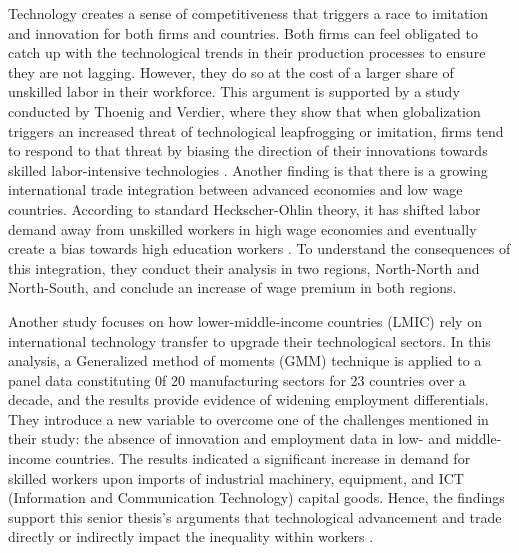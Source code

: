 \documentclass[12pt,oneside]{book} %
\begin{document}
Technology creates a sense of competitiveness that triggers a race to imitation and innovation for both firms and countries. Both firms can feel obligated to catch up with the technological trends in their production processes to ensure they are not lagging. However, they do so at the cost of a larger share of unskilled labor in their workforce. This argument is supported by a study conducted by Thoenig and Verdier, where they show that when globalization triggers an increased threat of technological leapfrogging or imitation, firms tend to respond to that threat by biasing the direction of their innovations towards skilled labor-intensive technologies \cite{thoenig2003theory}. Another finding is that there is a  growing international trade integration between advanced economies and low wage countries. According to standard Heckscher-Ohlin theory, it has shifted labor demand away from unskilled workers in high wage economies and eventually create a bias towards high education workers \cite{leamerheckscher}. To understand the consequences of this integration, they conduct their analysis in two regions, North-North and North-South, and conclude an increase of wage premium in both regions.

Another study focuses on how lower-middle-income countries (LMIC) rely on international technology transfer to upgrade their technological sectors. In this analysis, a Generalized method of moments (GMM) technique is applied to a panel data constituting 0f 20 manufacturing sectors for 23 countries over a decade, and the results provide evidence of widening employment differentials. They introduce a new variable to overcome one of the challenges mentioned in their study: the absence of innovation and employment data in low- and middle-income countries. The results indicated a significant increase in demand for skilled workers upon imports of industrial machinery, equipment, and ICT (Information and Communication Technology) capital goods. Hence, the findings support this senior thesis's arguments that technological advancement and trade directly or indirectly impact the inequality within workers \cite{conte2011imported}.
\end{document}
